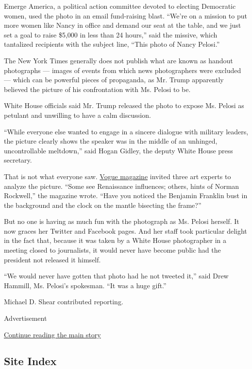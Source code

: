 Emerge America, a political action committee devoted to electing
Democratic women, used the photo in an email fund-raising blast. ``We're
on a mission to put more women like Nancy in office and demand our seat
at the table, and we just set a goal to raise \$5,000 in less than 24
hours,'' said the missive, which tantalized recipients with the subject
line, ``This photo of Nancy Pelosi.''

The New York Times generally does not publish what are known as handout
photographs --- images of events from which news photographers were
excluded --- which can be powerful pieces of propaganda, as Mr. Trump
apparently believed the picture of his confrontation with Ms. Pelosi to
be.

White House officials said Mr. Trump released the photo to expose Ms.
Pelosi as petulant and unwilling to have a calm discussion.

``While everyone else wanted to engage in a sincere dialogue with
military leaders, the picture clearly shows the speaker was in the
middle of an unhinged, uncontrollable meltdown,'' said Hogan Gidley, the
deputy White House press secretary.

That is not what everyone saw.
\href{https://www.vogue.com/article/nancy-pelosi-donald-trump-white-house-photo-analyzed?verso=true}{Vogue
magazine} invited three art experts to analyze the picture. ``Some see
Renaissance influences; others, hints of Norman Rockwell,'' the magazine
wrote. ``Have you noticed the Benjamin Franklin bust in the background
and the clock on the mantle bisecting the frame?''

But no one is having as much fun with the photograph as Ms. Pelosi
herself. It now graces her Twitter and Facebook pages. And her staff
took particular delight in the fact that, because it was taken by a
White House photographer in a meeting closed to journalists, it would
never have become public had the president not released it himself.

``We would never have gotten that photo had he not tweeted it,'' said
Drew Hammill, Ms. Pelosi's spokesman. ``It was a huge gift.''

Michael D. Shear contributed reporting.

Advertisement

\protect\hyperlink{after-bottom}{Continue reading the main story}

\hypertarget{site-index}{%
\subsection{Site Index}\label{site-index}}

